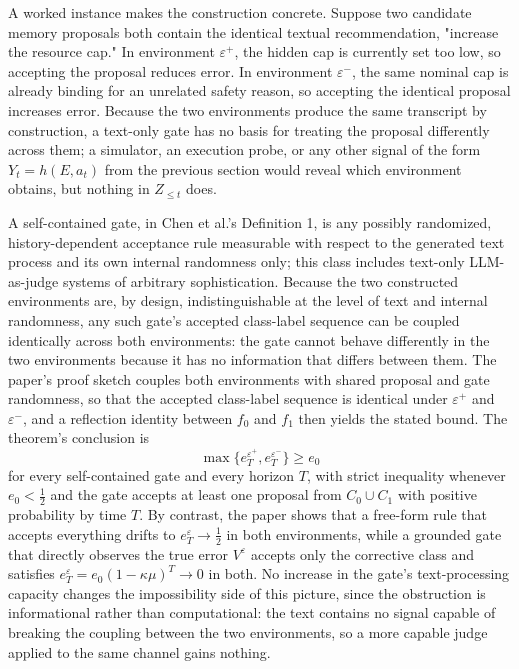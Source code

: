 \documentclass[11pt]{article}
\begin{document}
A worked instance makes the construction concrete. Suppose two candidate memory proposals both contain the identical textual recommendation, "increase the resource cap." In environment $\varepsilon^+$, the hidden cap is currently set too low, so accepting the proposal reduces error. In environment $\varepsilon^-$, the same nominal cap is already binding for an unrelated safety reason, so accepting the identical proposal increases error. Because the two environments produce the same transcript by construction, a text-only gate has no basis for treating the proposal differently across them; a simulator, an execution probe, or any other signal of the form $Y_t = h(E, a_t)$ from the previous section would reveal which environment obtains, but nothing in $Z_{\le t}$ does.

A self-contained gate, in Chen et al.'s Definition 1, is any possibly randomized, history-dependent acceptance rule measurable with respect to the generated text process and its own internal randomness only; this class includes text-only LLM-as-judge systems of arbitrary sophistication. Because the two constructed environments are, by design, indistinguishable at the level of text and internal randomness, any such gate's accepted class-label sequence can be coupled identically across both environments: the gate cannot behave differently in the two environments because it has no information that differs between them. The paper's proof sketch couples both environments with shared proposal and gate randomness, so that the accepted class-label sequence is identical under $\varepsilon^+$ and $\varepsilon^-$, and a reflection identity between $f_0$ and $f_1$ then yields the stated bound. The theorem's conclusion is
$$\max\{e_T^{\varepsilon^+}, e_T^{\varepsilon^-}\} \ge e_0$$
for every self-contained gate and every horizon $T$, with strict inequality whenever $e_0 < \tfrac{1}{2}$ and the gate accepts at least one proposal from $C_0 \cup C_1$ with positive probability by time $T$. By contrast, the paper shows that a free-form rule that accepts everything drifts to $e_T^\varepsilon \to \tfrac{1}{2}$ in both environments, while a grounded gate that directly observes the true error $V^\varepsilon$ accepts only the corrective class and satisfies $e_T^\varepsilon = e_0(1-\kappa\mu)^T \to 0$ in both. No increase in the gate's text-processing capacity changes the impossibility side of this picture, since the obstruction is informational rather than computational: the text contains no signal capable of breaking the coupling between the two environments, so a more capable judge applied to the same channel gains nothing.
\end{document}
